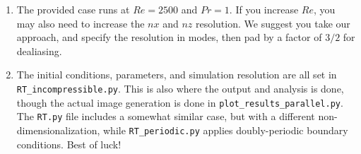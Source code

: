 \documentclass[12pt, preprint]{aastex}
\begin{document}
\begin{description}
\begin{enumerate}
         \item The provided case runs at $Re=2500$ and $Pr=1$.  If you
           increase $Re$, you may also need to increase the $nx$ and
           $nz$ resolution.  We suggest you take our approach, and
           specify the resolution in modes, then pad by a factor of
           $3/2$ for dealiasing.


         \item The initial conditions, parameters, and simulation
           resolution are all set in \verb+RT_incompressible.py+.  This is also where
           the output and analysis is done, though the actual image
           generation is done in \verb+plot_results_parallel.py+.  The
           \verb+RT.py+ file includes a somewhat similar case, but
           with a different non-dimensionalization, while
           \verb+RT_periodic.py+ applies doubly-periodic boundary conditions.
           Best of luck!

\end{enumerate}
\end{description}
\end{document}
